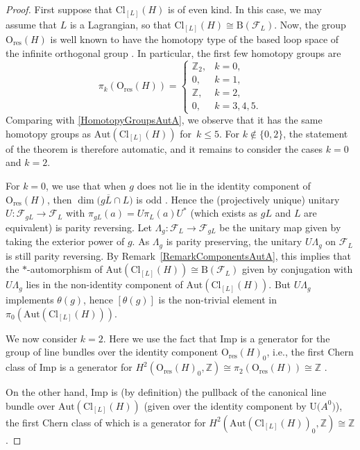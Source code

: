 \documentclass[pdftex]{sigma}
\numberwithin{equation}{section}
\newcommand{\Z}{\mathbb{Z}}
\newcommand{\B}{\mathrm{B}}
\newcommand{\Cl}{\mathrm{Cl}}
\newcommand{\res}{\mathrm{res}}
\newcommand{\Aut}{\mathrm{Aut}}
\newcommand{\Imp}{\mathrm{Imp}}
\newcommand{\U}{\mathrm{U}}
\renewcommand{\O}{\mathrm{O}}
\begin{document}
\begin{proof}
First suppose that $\Cl_{[L]}(H)$ is of even kind.
In this case, we may assume that $L$ is a Lagrangian, so that $\Cl_{[L]}(H) \cong \B(\mathcal{F}_L)$.
Now, the group $\O_{\res}(H)$ is well known to have the homotopy type of the based loop space of the infinite orthogonal group \cite[Proposition~12.4.2]{PressleySegal}.
In particular, the first few homotopy groups are
\begin{equation} \label{FirstHomotopyGroupsOres}
 \pi_k(\O_{\res}(H)) = \begin{cases} \Z_2, & k=0, \\ 0, & k=1, \\ \Z, & k=2, \\ 0, & k=3, 4, 5. \end{cases}
\end{equation}
Comparing with \eqref{HomotopyGroupsAutA}, we observe that it has the same homotopy groups as $\Aut(\Cl_{[L]}(H))$ for~$k \leq 5$.
For $k\notin\{0, 2\}$, the statement of the theorem is therefore automatic, and it remains to consider the cases $k=0$ and $k=2$.

For $k=0$, we use that when $g$ does not lie in the identity component of $\O_{\res}(H)$, then $\dim\big(g \overline{L} \cap L\big)$ is odd \cite[Theorem~3.5.1]{PlymenRobinson}.
Hence the (projectively unique) unitary $U\colon \mathcal{F}_{gL} \to \mathcal{F}_L$ with $\pi_{gL}(a) = U \pi_L(a) U^*$ (which exists as $gL$ and $L$ are equivalent) is parity reversing.
Let $\Lambda_g\colon \mathcal{F}_L \to \mathcal{F}_{gL}$ be the unitary map given by taking the exterior power of $g$.
As $\Lambda_g$ is parity preserving, the unitary $U \Lambda_g$ on $\mathcal{F}_L$ is still parity reversing.
By Remark~\ref{RemarkComponentsAutA}, this implies that the $*$-automorphism of $\Aut(\Cl_{[L]}(H)) \cong \B(\mathcal{F}_L)$ given by conjugation with $U \Lambda_g$ lies in the non-identity component of $\Aut(\Cl_{[L]}(H))$. But $U \Lambda_g$ implements $\theta(g)$, hence $[\theta(g)]$ is the non-trivial element in $\pi_0(\Aut(\Cl_{[L]}(H)))$.

We now consider $k=2$.
Here we use the fact that $\Imp$ is a generator for the group of line bundles over the identity component $\O_{\res}(H)_0$, i.e., the first Chern class of $\Imp$ is a generator for $H^2(\O_{\res}(H)_0, \Z) \cong \pi_2(\O_{\res}(H)) \cong \Z$ \cite[Proposition~1.2]{SperaWurzbacherSpinors}.


On the other hand, $\Imp$ is (by definition) the pullback of the canonical line bundle over $\Aut(\Cl_{[L]}(H))$ \big(given over the identity component by $\U\big(A^0\big)$\big), the first Chern class of which is a generator for $H^2(\Aut(\Cl_{[L]}(H))_0, \Z) \cong \Z$.


\end{proof}
\end{document}
